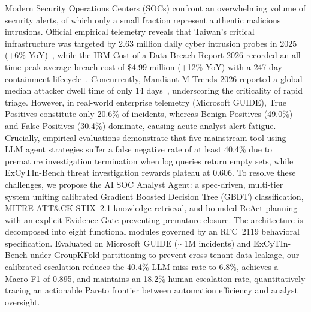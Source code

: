 Modern Security Operations Centers (SOCs) confront an overwhelming volume
of security alerts, of which only a small fraction represent authentic malicious
intrusions. Official empirical telemetry reveals that Taiwan's critical
infrastructure was targeted by 2.63 million daily cyber intrusion probes in 2025
(+6\% YoY)~\cite{nsb2026taiwan}, while the IBM Cost of a Data Breach Report 2026
recorded an all-time peak average breach cost of \$4.99 million (+12\% YoY) with
a 247-day containment lifecycle~\cite{ibm2026databreach}. Concurrently, Mandiant
M-Trends 2026 reported a global median attacker dwell time of only 14
days~\cite{mandiant2026mtrends}, underscoring the criticality of rapid triage.
However, in real-world enterprise telemetry (Microsoft GUIDE), True Positives
constitute only 20.6\% of incidents, whereas Benign Positives (49.0\%) and False
Positives (30.4\%) dominate, causing acute analyst alert fatigue. Crucially,
empirical evaluations demonstrate that five mainstream tool-using LLM agent
strategies suffer a false negative rate of at least 40.4\% due to premature
investigation termination when log queries return empty sets, while ExCyTIn-Bench
threat investigation rewards plateau at 0.606. To resolve these challenges, we
propose the AI SOC Analyst Agent: a spec-driven, multi-tier system uniting
calibrated Gradient Boosted Decision Tree (GBDT) classification, MITRE ATT\&CK
STIX~2.1 knowledge retrieval, and bounded ReAct planning with an explicit Evidence
Gate preventing premature closure. The architecture is decomposed into eight
functional modules governed by an RFC~2119 behavioral specification. Evaluated on
Microsoft GUIDE ($\sim$1M incidents) and ExCyTIn-Bench under GroupKFold
partitioning to prevent cross-tenant data leakage, our calibrated escalation
reduces the 40.4\% LLM miss rate to 6.8\%, achieves a Macro-F1 of 0.895, and
maintains an 18.2\% human escalation rate, quantitatively tracing an actionable
Pareto frontier between automation efficiency and analyst oversight.
